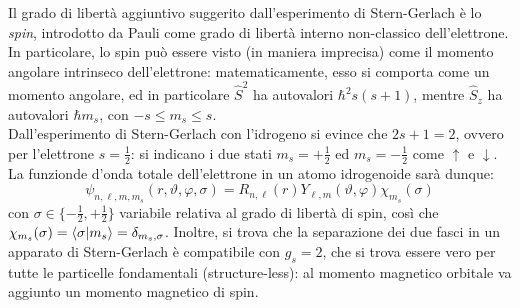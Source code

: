 Il grado di libertà aggiuntivo suggerito dall'esperimento di Stern-Gerlach è lo \textit{spin}, introdotto da Pauli come grado di libertà interno non-classico dell'elettrone. In particolare, lo spin può essere visto (in maniera imprecisa) come il momento angolare intrinseco dell'elettrone: matematicamente, esso si comporta come un momento angolare, ed in particolare $ \hat{S}^2 $ ha autovalori $ \hbar^2 s(s+1) $, mentre $ \hat{S}_z $ ha autovalori $ \hbar m_s $, con $ -s \le m_s \le s $.\\
Dall'esperimento di Stern-Gerlach con l'idrogeno si evince che $ 2s + 1 = 2 $, ovvero per l'elettrone $ s = \frac{1}{2} $: si indicano i due stati $ m_s = + \frac{1}{2} $ ed $ m_s = - \frac{1}{2} $ come $ \uparrow $ e $ \downarrow $. La funzionde d'onda totale dell'elettrone in un atomo idrogenoide sarà dunque:
\begin{equation}
	\psi_{n,\ell,m,m_s}(r,\vartheta,\varphi,\sigma) = R_{n,\ell}(r) Y_{\ell,m}(\vartheta,\varphi) \chi_{m_s}(\sigma)
\end{equation}
con $ \sigma \in \{-\frac{1}{2} , +\frac{1}{2}\} $ variabile relativa al grado di libertà di spin, così che $ \chi_{m_s}(\sigma) = \braket{\sigma | m_s} = \delta_{m_s , \sigma} $. Inoltre, si trova che la separazione dei due fasci in un apparato di Stern-Gerlach è compatibile con $ g_s = 2 $, che si trova essere vero per tutte le particelle fondamentali (structure-less): al momento magnetico orbitale va aggiunto un momento magnetico di spin.

